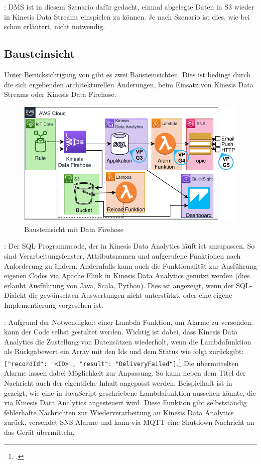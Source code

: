 : \ac{DMS} ist in diesem Szenario dafür gedacht, einmal abgelegte Daten in S3 wieder in Kinesis Data Streams einspielen zu können. Je nach Szenario ist dies, wie bei  schon erläutert, nicht notwendig.

\subsection{Bausteinsicht}
Unter Berücksichtigung von  gibt es zwei Bausteinsichten. Dies ist bedingt durch die sich ergebenden architekturellen Änderungen, beim Einsatz von Kinesis Data Streams oder Kinesis Data Firehose. 

\begin{figure}[H]
\centering
\includegraphics[width=\textwidth]{graphics/Echtzeit-RA-Elements-Firehose.pdf}
\caption{Bausteinsicht mit Data Firehose}
\label{abb:ElementeEchtzeitRA}
\end{figure}

: Der \ac{SQL} Programmcode, der in Kinesis Data Analytics läuft ist anzupassen. So sind Verarbeitungsfenster, Attributsnamen und aufgerufene Funktionen nach Anforderung zu ändern. Andernfalls kann auch die Funktionalität zur Ausführung eigenen Codes via Apache Flink in Kinesis Data Analytics genutzt werden (dies erlaubt Ausführung von Java, Scala, Python). Dies ist angezeigt, wenn der \ac{SQL}-Dialekt die gewünschten Auswertungen nicht unterstützt, oder eine eigene Implementierung vorgesehen ist.

: Aufgrund der Notwendigkeit einer Lambda Funktion, um Alarme zu versenden, kann der Code selbst gestaltet werden. Wichtig ist dabei, dass Kinesis Data Analytics die Zustellung von Datensätzen wiederholt, wenn die Lambdafunktion als Rückgabewert ein Array mit den Ids und dem Status wie folgt zurückgibt: \texttt{[{"recordId": "<ID>", "result": "DeliveryFailed"}]}.\footcite[Vgl.][]{AmazonWebServicesInc..o.J.ay} Die übermittelten Alarme lassen dabei Möglichkeit zur Anpassung. So kann neben dem Titel der Nachricht auch der eigentliche Inhalt angepasst werden. Beispielhaft ist in  gezeigt, wie eine in JavaScript geschriebene Lambdafunktion aussehen könnte, die via Kinesis Data Analytics angesteuert wird. Diese Funktion gibt selbstständig fehlerhafte Nachrichten zur Wiederverarbeitung an Kinesis Data Analytics zurück, versendet \ac{SNS} Alarme und kann via \ac{MQTT} eine Shutdown Nachricht an das Gerät übermitteln.

